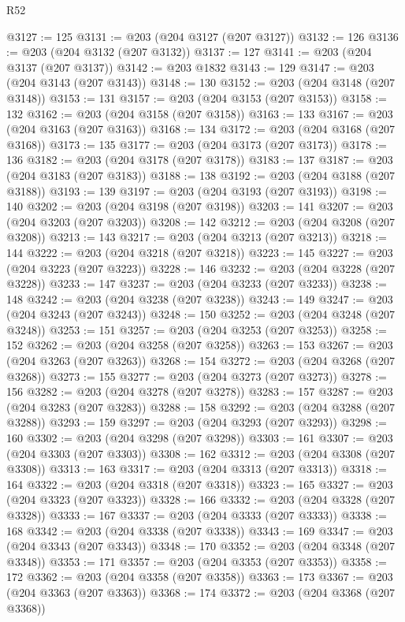 \begin{lexlean}{R52}
\begin{coremodule}
@3127 := 125
@3131 := @203 (@204 @3127 (@207 @3127))
@3132 := 126
@3136 := @203 (@204 @3132 (@207 @3132))
@3137 := 127
@3141 := @203 (@204 @3137 (@207 @3137))
@3142 := @203 @1832
@3143 := 129
@3147 := @203 (@204 @3143 (@207 @3143))
@3148 := 130
@3152 := @203 (@204 @3148 (@207 @3148))
@3153 := 131
@3157 := @203 (@204 @3153 (@207 @3153))
@3158 := 132
@3162 := @203 (@204 @3158 (@207 @3158))
@3163 := 133
@3167 := @203 (@204 @3163 (@207 @3163))
@3168 := 134
@3172 := @203 (@204 @3168 (@207 @3168))
@3173 := 135
@3177 := @203 (@204 @3173 (@207 @3173))
@3178 := 136
@3182 := @203 (@204 @3178 (@207 @3178))
@3183 := 137
@3187 := @203 (@204 @3183 (@207 @3183))
@3188 := 138
@3192 := @203 (@204 @3188 (@207 @3188))
@3193 := 139
@3197 := @203 (@204 @3193 (@207 @3193))
@3198 := 140
@3202 := @203 (@204 @3198 (@207 @3198))
@3203 := 141
@3207 := @203 (@204 @3203 (@207 @3203))
@3208 := 142
@3212 := @203 (@204 @3208 (@207 @3208))
@3213 := 143
@3217 := @203 (@204 @3213 (@207 @3213))
@3218 := 144
@3222 := @203 (@204 @3218 (@207 @3218))
@3223 := 145
@3227 := @203 (@204 @3223 (@207 @3223))
@3228 := 146
@3232 := @203 (@204 @3228 (@207 @3228))
@3233 := 147
@3237 := @203 (@204 @3233 (@207 @3233))
@3238 := 148
@3242 := @203 (@204 @3238 (@207 @3238))
@3243 := 149
@3247 := @203 (@204 @3243 (@207 @3243))
@3248 := 150
@3252 := @203 (@204 @3248 (@207 @3248))
@3253 := 151
@3257 := @203 (@204 @3253 (@207 @3253))
@3258 := 152
@3262 := @203 (@204 @3258 (@207 @3258))
@3263 := 153
@3267 := @203 (@204 @3263 (@207 @3263))
@3268 := 154
@3272 := @203 (@204 @3268 (@207 @3268))
@3273 := 155
@3277 := @203 (@204 @3273 (@207 @3273))
@3278 := 156
@3282 := @203 (@204 @3278 (@207 @3278))
@3283 := 157
@3287 := @203 (@204 @3283 (@207 @3283))
@3288 := 158
@3292 := @203 (@204 @3288 (@207 @3288))
@3293 := 159
@3297 := @203 (@204 @3293 (@207 @3293))
@3298 := 160
@3302 := @203 (@204 @3298 (@207 @3298))
@3303 := 161
@3307 := @203 (@204 @3303 (@207 @3303))
@3308 := 162
@3312 := @203 (@204 @3308 (@207 @3308))
@3313 := 163
@3317 := @203 (@204 @3313 (@207 @3313))
@3318 := 164
@3322 := @203 (@204 @3318 (@207 @3318))
@3323 := 165
@3327 := @203 (@204 @3323 (@207 @3323))
@3328 := 166
@3332 := @203 (@204 @3328 (@207 @3328))
@3333 := 167
@3337 := @203 (@204 @3333 (@207 @3333))
@3338 := 168
@3342 := @203 (@204 @3338 (@207 @3338))
@3343 := 169
@3347 := @203 (@204 @3343 (@207 @3343))
@3348 := 170
@3352 := @203 (@204 @3348 (@207 @3348))
@3353 := 171
@3357 := @203 (@204 @3353 (@207 @3353))
@3358 := 172
@3362 := @203 (@204 @3358 (@207 @3358))
@3363 := 173
@3367 := @203 (@204 @3363 (@207 @3363))
@3368 := 174
@3372 := @203 (@204 @3368 (@207 @3368))

\end{coremodule}
\end{lexlean}
